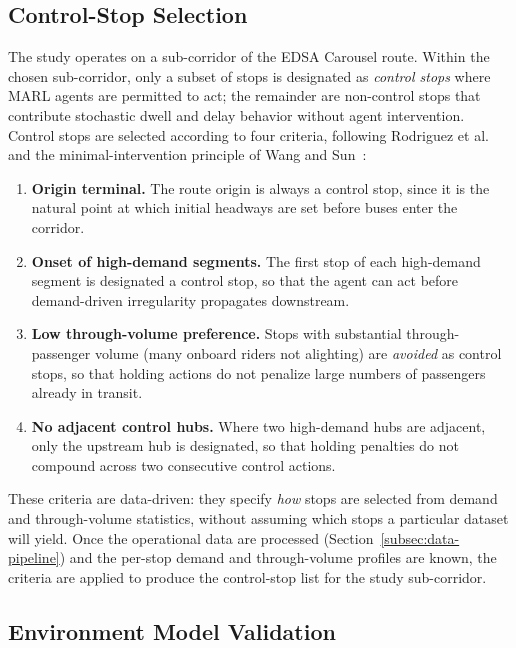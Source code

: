 \subsection{Control-Stop Selection}
\label{subsec:control-stop-selection}

The study operates on a sub-corridor of the EDSA Carousel route. Within the chosen sub-corridor, only a subset of stops is designated as \textit{control stops} where MARL agents are permitted to act; the remainder are non-control stops that contribute stochastic dwell and delay behavior without agent intervention. Control stops are selected according to four criteria, following Rodriguez et al.~\cite{Rodriguez2023Cooperative} and the minimal-intervention principle of Wang and Sun~\cite{Wangsun}:

\begin{enumerate}
    \item \textbf{Origin terminal.} The route origin is always a control stop, since it is the natural point at which initial headways are set before buses enter the corridor.
    \item \textbf{Onset of high-demand segments.} The first stop of each high-demand segment is designated a control stop, so that the agent can act before demand-driven irregularity propagates downstream.
    \item \textbf{Low through-volume preference.} Stops with substantial through-passenger volume (many onboard riders not alighting) are \textit{avoided} as control stops, so that holding actions do not penalize large numbers of passengers already in transit.
    \item \textbf{No adjacent control hubs.} Where two high-demand hubs are adjacent, only the upstream hub is designated, so that holding penalties do not compound across two consecutive control actions.
\end{enumerate}

These criteria are data-driven: they specify \textit{how} stops are selected from demand and through-volume statistics, without assuming which stops a particular dataset will yield. Once the operational data are processed (Section~\ref{subsec:data-pipeline}) and the per-stop demand and through-volume profiles are known, the criteria are applied to produce the control-stop list for the study sub-corridor.

\subsection{Environment Model Validation}

